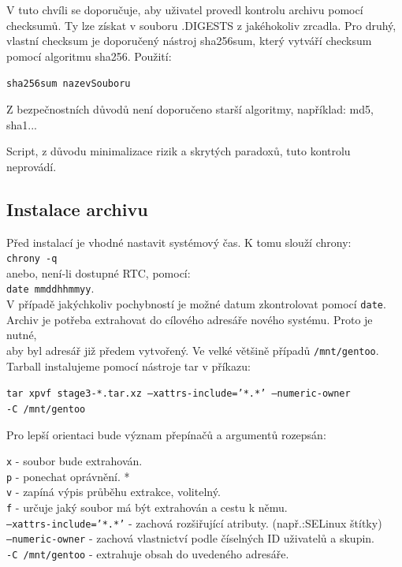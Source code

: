 \documentclass[12pt,a4paper,twoside,]{article}
\begin{document}
{V tuto chvíli se doporučuje, aby uživatel provedl kontrolu archivu pomocí checksumů.
Ty lze získat v souboru .DIGESTS z jakéhokoliv zrcadla. Pro druhý, vlastní checksum je doporučený nástroj sha256sum, který vytváří checksum pomocí algoritmu sha256. Použití:

\texttt{sha256sum nazevSouboru}

Z bezpečnostních důvodů není doporučeno starší algoritmy, například: md5, sha1...

Script, z důvodu minimalizace rizik a skrytých paradoxů, tuto kontrolu neprovádí.
\newpage
\subsection{\textsf{Instalace archivu}}
Před instalací je vhodné nastavit systémový čas. K tomu slouží chrony:\\
\texttt{chrony -q}\\
 anebo, není-li dostupné RTC, pomocí: \\ \texttt{date mmddhhmmyy}.\\
 
V případě jakýchkoliv pochybností je možné datum zkontrolovat pomocí \texttt{date}.
\\Archiv je potřeba extrahovat do cílového adresáře nového systému. Proto je nutné,\\
aby byl adresář již předem vytvořený. Ve velké většině případů \texttt{/mnt/gentoo}.\\
Tarball instalujeme pomocí nástroje tar v příkazu:

\texttt{tar xpvf stage3-*.tar.xz --xattrs-include='*.*' --numeric-owner \\-C /mnt/gentoo}

Pro lepší orientaci bude význam přepínačů a argumentů rozepsán:

\texttt{x} - soubor bude extrahován.\\
\texttt{p} - ponechat oprávnění. *\\
\texttt{v} - zapíná výpis průběhu extrakce, volitelný.\\
\texttt{f} - určuje jaký soubor má být extrahován a cestu k němu.\\
\texttt{--xattrs-include='*.*'} - zachová rozšiřující atributy.
(např.:SELinux štítky)\\
\texttt{--numeric-owner} - zachová vlastnictví podle číselných ID uživatelů a
skupin.\\
\texttt{-C /mnt/gentoo} - extrahuje obsah do uvedeného adresáře.\\

}
\end{document}
